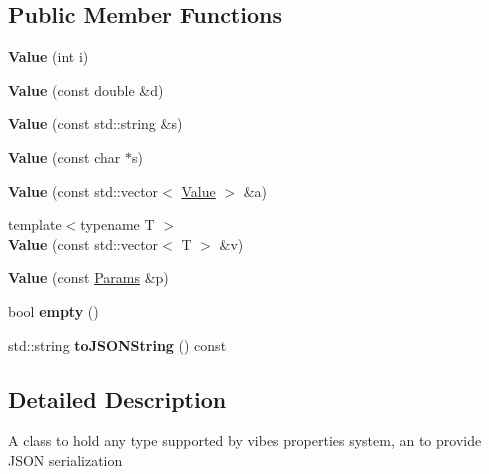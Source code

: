 \subsection*{Public Member Functions}
\begin{DoxyCompactItemize}
\item 
\mbox{\label{classvibes_1_1_value_a4484927bdccc0eb7f297f99946430bb7}} 
{\bfseries Value} (int i)
\item 
\mbox{\label{classvibes_1_1_value_a21e69d0bfd4ee4fc0f702daba547a032}} 
{\bfseries Value} (const double \&d)
\item 
\mbox{\label{classvibes_1_1_value_ae71ae2556d8f7fa0826864785569075f}} 
{\bfseries Value} (const std\+::string \&s)
\item 
\mbox{\label{classvibes_1_1_value_a4fceca6cd8a629056555ac5317d8f678}} 
{\bfseries Value} (const char $\ast$s)
\item 
\mbox{\label{classvibes_1_1_value_a5ce0c0f704821b6bdf5438814408317d}} 
{\bfseries Value} (const std\+::vector$<$ \hyperlink{classvibes_1_1_value}{Value} $>$ \&a)
\item 
\mbox{\label{classvibes_1_1_value_a2c2357e27be37dbece5861bec4ce5023}} 
{\footnotesize template$<$typename T $>$ }\\{\bfseries Value} (const std\+::vector$<$ T $>$ \&v)
\item 
\mbox{\label{classvibes_1_1_value_aea7895624e463bcd941f52efef008f93}} 
{\bfseries Value} (const \hyperlink{classvibes_1_1_params}{Params} \&p)
\item 
\mbox{\label{classvibes_1_1_value_a09470a0e51cfcdf1d236407f6e72547e}} 
bool {\bfseries empty} ()
\item 
\mbox{\label{classvibes_1_1_value_a90b2be6f0295290fe56e74d583537195}} 
std\+::string {\bfseries to\+J\+S\+O\+N\+String} () const
\end{DoxyCompactItemize}


\subsection{Detailed Description}
A class to hold any type supported by vibes properties system, an to provide J\+S\+ON serialization

